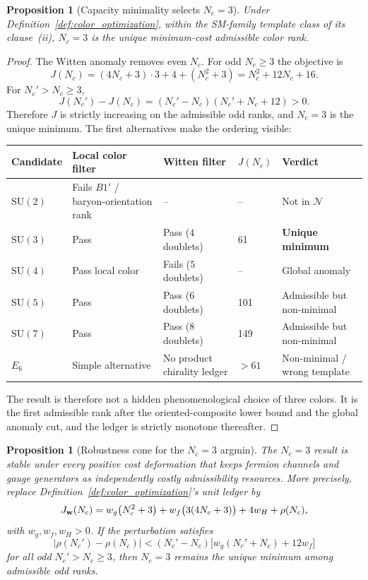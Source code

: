 \documentclass[11pt]{article}
\newtheorem{proposition}[theorem]{Proposition}
\theoremstyle{definition}
\newcommand{\SU}{\mathrm{SU}}
\begin{document}
\begin{proposition}[Capacity minimality selects $N_c = 3$]\label{prop:Nc3}
Under Definition~\ref{def:color_optimization}, within the SM-family
template class of its clause~(ii), $N_c=3$ is the unique minimum-cost
admissible color rank.
\end{proposition}

\begin{proof}
The Witten anomaly removes even $N_c$.  For odd $N_c\ge3$ the objective
is
\[
  J(N_c)=(4N_c+3)\cdot3+4+(N_c^2+3)=N_c^2+12N_c+16.
\]
For $N_c' > N_c \ge 3$,
\[
  J(N_c')-J(N_c)=(N_c'-N_c)(N_c'+N_c+12)>0.
\]
Therefore $J$ is strictly increasing on the admissible odd ranks, and
$N_c=3$ is the unique minimum.  The first alternatives make the ordering
visible:
\begin{center}
\scriptsize
\renewcommand{\arraystretch}{1.12}
\begin{tabular}{@{}p{1.5cm}p{3.2cm}p{2.5cm}p{1.5cm}p{3.4cm}@{}}
\toprule
\textbf{Candidate} & \textbf{Local color filter} & \textbf{Witten filter} & \textbf{$J(N_c)$} & \textbf{Verdict} \\
\midrule
$\SU(2)$ & Fails $B1'$ / baryon-orientation rank & -- & -- & Not in $\mathcal N$ \\
$\SU(3)$ & Pass & Pass ($4$ doublets) & 61 & \textbf{Unique minimum} \\
$\SU(4)$ & Pass local color & Fails ($5$ doublets) & -- & Global anomaly \\
$\SU(5)$ & Pass & Pass ($6$ doublets) & 101 & Admissible but non-minimal \\
$\SU(7)$ & Pass & Pass ($8$ doublets) & 149 & Admissible but non-minimal \\
$E_6$ & Simple alternative & No product chirality ledger & $>61$ & Non-minimal / wrong template \\
\bottomrule
\end{tabular}
\end{center}
The result is therefore not a hidden phenomenological choice of three
colors.  It is the first admissible rank after the oriented-composite
lower bound and the global anomaly cut, and the ledger is strictly
monotone thereafter.
\end{proof}




\begin{proposition}[Robustness cone for the $N_c=3$ argmin]
\label{prop:nc3_robustness_v34}
The $N_c=3$ result is stable under every positive cost deformation that keeps
fermion channels and gauge generators as independently costly admissibility
resources.  More precisely, replace Definition~\ref{def:color_optimization}'s
unit ledger by
\begin{equation}
  J_{\bf w}(N_c)=w_g\bigl(N_c^2+3\bigr)
  +w_f\bigl(3(4N_c+3)\bigr)+4w_H+\rho(N_c),
\end{equation}
with $w_g,w_f,w_H>0$.  If the perturbation satisfies
\begin{equation}
  |\rho(N_c')-\rho(N_c)|<
  (N_c'-N_c)\bigl[w_g(N_c'+N_c)+12w_f\bigr]
\end{equation}
for all odd $N_c'>N_c\ge 3$, then $N_c=3$ remains the unique minimum
among admissible odd ranks.
\end{proposition}
\end{document}
